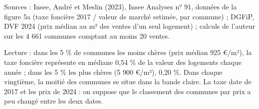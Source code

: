 Sources : Insee, André et Meslin (2023), Insee Analyses n° 91, données de la figure 5a (taxe foncière 2017 / valeur de marché estimée, par commune) ; DGFiP, DVF 2024 (prix médian au m² des ventes d'un seul logement) ; calculs de l'auteur sur les 4 661 communes comptant au moins 20 ventes.\par Lecture : dans les 5 \% de communes les moins chères (prix médian 925 \euro{}/m²), la taxe foncière représente en médiane 0,54 \% de la valeur des logements chaque année ; dans les 5 \% les plus chères (5 900 \euro{}/m²), 0,20 \%. Dans chaque vingtième, la moitié des communes se situe dans la bande claire. La taxe date de 2017 et les prix de 2024 : on suppose que le classement des communes par prix a peu changé entre les deux dates.
